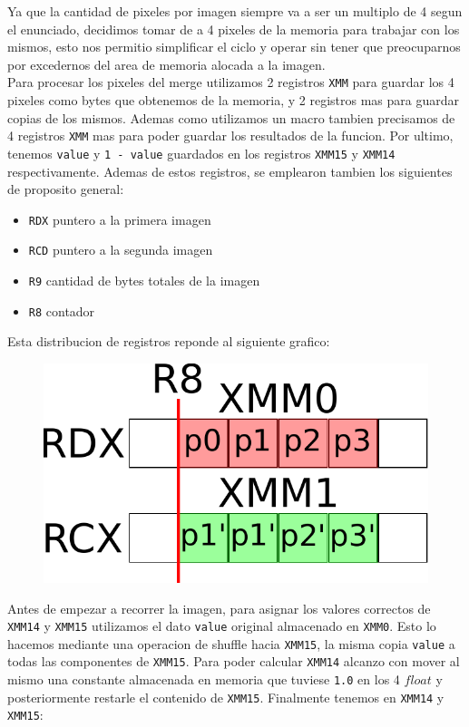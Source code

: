 Ya que la cantidad de pixeles por imagen siempre va a ser un multiplo de 4 segun el enunciado, decidimos tomar de a 4 pixeles de la memoria para trabajar con los mismos, esto nos permitio simplificar el ciclo y operar sin tener que preocuparnos por excedernos del area de memoria alocada a la imagen.\\

Para procesar los pixeles del merge utilizamos 2 registros \texttt{XMM} para guardar los 4 pixeles como bytes que obtenemos de la memoria, y 2 registros mas para guardar copias de los mismos. Ademas como utilizamos un macro tambien precisamos de 4 registros \texttt{XMM} mas para poder guardar los resultados de la funcion. Por ultimo, tenemos \texttt{value} y \texttt{1 - value} guardados en los registros \texttt{XMM15} y \texttt{XMM14} respectivamente. Ademas de estos registros, se emplearon tambien los siguientes de proposito general:\\

\noindent
\begin{itemize}
	\item \texttt{RDX} puntero a la primera imagen
	\item \texttt{RCD} puntero a la segunda imagen
	\item \texttt{R9} cantidad de bytes totales de la imagen
	\item \texttt{R8} contador
\end{itemize}

Esta distribucion de registros reponde al siguiente grafico:

\begin{figure}[h!]
	\centering
	\includegraphics[scale=0.5]{images/MergeASM1_0}
\end{figure}

Antes de empezar a recorrer la imagen, para asignar los valores correctos de \texttt{XMM14} y \texttt{XMM15} utilizamos el dato \texttt{value} original almacenado en \texttt{XMM0}. Esto lo hacemos mediante una operacion de shuffle hacia \texttt{XMM15}, la misma copia \texttt{value} a todas las componentes de \texttt{XMM15}. Para poder calcular \texttt{XMM14} alcanzo con mover al mismo una constante almacenada en memoria que tuviese \texttt{1.0} en los 4 $float$ y posteriormente restarle el contenido de \texttt{XMM15}. Finalmente tenemos en \texttt{XMM14} y \texttt{XMM15}:\\

